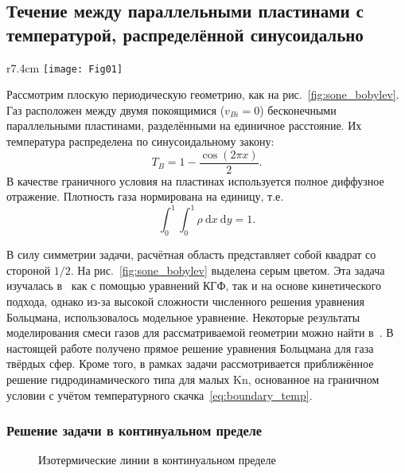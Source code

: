 \documentclass[
aps,%
12pt,%
final,%
notitlepage,%
oneside,%
onecolumn,%
nobibnotes,%
nofootinbib,%
superscriptaddress,%
noshowpacs,%
showkeys,%
centertags]%
{revtex4}
\newcommand{\Kn}{\mathrm{Kn}}
\newcommand{\dd}{\:\mathrm{d}}
\begin{document}
\subsection{Течение между параллельными пластинами с температурой, распределённой синусоидально}

\begin{wrapfigure}{r}{7.4cm}
    \vspace{-10pt}
    \centering
    \texttt{[image: Fig01]}
    \vspace{-20pt}
    \caption{Геометрия задачи}\label{fig:sone_bobylev}
    \vspace{20pt}
\end{wrapfigure}

Рассмотрим плоскую периодическую геометрию, как на рис.~\ref{fig:sone_bobylev}.
Газ расположен между двумя покоящимися (\(v_{Bi} = 0\)) бесконечными параллельными пластинами,
разделёнными на единичное расстояние. Их температура распределена по синусоидальному закону:
\begin{equation}
    T_B = 1 - \frac{\cos(2\pi x)}{2}.
\end{equation}
В качестве граничного условия на пластинах используется полное диффузное отражение.
Плотность газа нормирована на единицу, т.е.
\begin{equation}\label{eq:total_mass}
    \int_0^1\int_0^1\rho\dd{x}\dd{y} = 1.
\end{equation}

В силу симметрии задачи, расчётная область представляет собой квадрат со стороной \(1/2\).
На рис.~\ref{fig:sone_bobylev} выделена серым цветом.
Эта задача изучалась в~\cite{Sone1996} как с помощью уравнений КГФ, так и на основе кинетического подхода,
однако из-за высокой сложности численного решения уравнения Больцмана, использовалось модельное уравнение.
Некоторые результаты моделирования смеси газов для рассматриваемой геометрии можно найти в~\cite{Wu2015}.
В настоящей работе получено прямое решение уравнения Больцмана для газа твёрдых сфер.
Кроме того, в рамках задачи рассмотривается приближённое решение гидродинамического типа для малых \(\Kn\),
основанное на граничном условии с учётом температурного скачка~\eqref{eq:boundary_temp}.

\subsubsection{Решение задачи в континуальном пределе}

\begin{figure}
    \caption{Изотермические линии в континуальном пределе}
    \label{fig:continuum:temp}
\end{figure}
\end{document}

